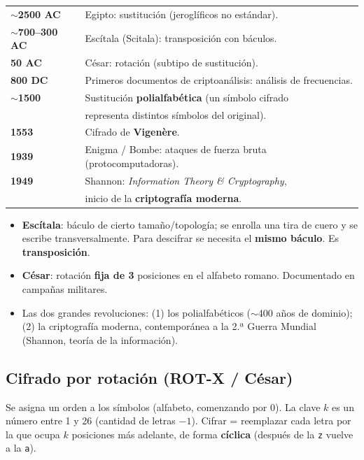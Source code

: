 \documentclass[../main.tex]{subfiles}
\begin{document}
\begin{center}
\begin{tabular}{ll}
\textbf{$\sim$2500 AC} & Egipto: sustitución (jeroglíficos no estándar). \\
\textbf{$\sim$700--300 AC} & Escítala (Scitala): transposición con báculos. \\
\textbf{50 AC} & César: rotación (subtipo de sustitución). \\
\textbf{800 DC} & Primeros documentos de criptoanálisis: análisis de frecuencias. \\
\textbf{$\sim$1500} & Sustitución \textbf{polialfabética} (un símbolo cifrado \\
                    & representa distintos símbolos del original). \\
\textbf{1553} & Cifrado de \textbf{Vigenère}. \\
\textbf{1939} & Enigma / Bombe: ataques de fuerza bruta (protocomputadoras). \\
\textbf{1949} & Shannon: \emph{Information Theory \& Cryptography}, \\
              & inicio de la \textbf{criptografía moderna}. \\
\end{tabular}
\end{center}

\begin{itemize}[nosep]
  \item \textbf{Escítala}: báculo de cierto tamaño/topología; se enrolla una
        tira de cuero y se escribe transversalmente. Para descifrar se necesita
        el \textbf{mismo báculo}. Es \textbf{transposición}.
  \item \textbf{César}: rotación \textbf{fija de 3} posiciones en el alfabeto
        romano. Documentado en campañas militares.
  \item Las dos grandes revoluciones: (1) los polialfabéticos
        ($\sim$400 años de dominio); (2) la criptografía moderna, contemporánea
        a la 2.ª Guerra Mundial (Shannon, teoría de la información).
\end{itemize}

\subsection{Cifrado por rotación (ROT-X / César)}

Se asigna un orden a los símbolos (alfabeto, comenzando por 0). La clave $k$ es
un número entre 1 y 26 (cantidad de letras $-1$). Cifrar = reemplazar cada letra
por la que ocupa $k$ posiciones más adelante, de forma \textbf{cíclica} (después
de la \texttt{z} vuelve a la \texttt{a}).
\end{document}
